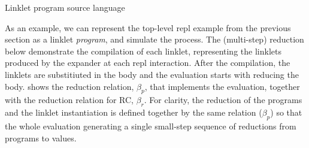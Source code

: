 		\begin{figure-here}
			\begin{todo}
				Linklet program source language
			\end{todo}


		\end{figure-here}


		\begin{paragraph-here}
			As an example, we can represent the top-level repl example from the
			previous section as a linklet \emph{program}, and simulate the
			process. The (multi-step) reduction below demonstrate the compilation of each
			linklet, representing the linklets produced by the expander at each
			repl interaction. After the compilation, the linklets are substitiuted
			in the body and the evaluation starts with reducing the
			body.  shows the reduction relation, $\beta_p$, that
			implements the evaluation, together with the reduction relation for
			RC, $\beta_r$. For clarity, the reduction of the programs and the linklet
			instantiation is defined together by the same relation ($\beta_p$) so that
			the whole evaluation generating a single small-step sequence of
			reductions from programs to values.
		\end{paragraph-here}


